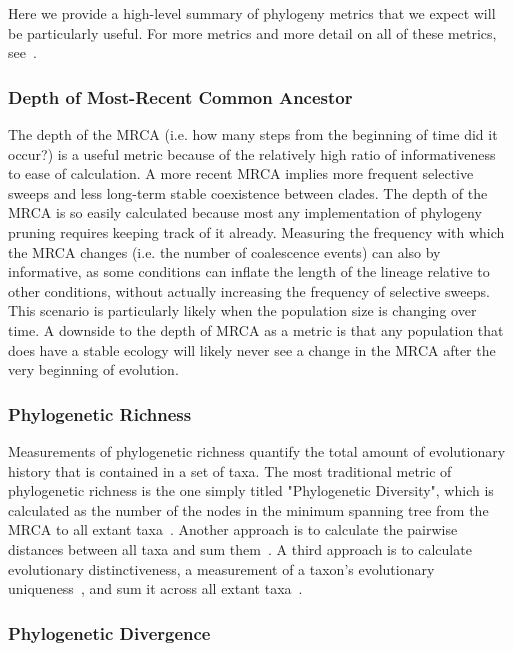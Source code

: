 \documentclass[letterpaper]{article}
\begin{document}
Here we provide a high-level summary of phylogeny metrics that we expect will be particularly useful. For more metrics and more detail on all of these metrics, see~\citep{winter_phylogenetic_2013, tucker_guide_2017}. 

\subsubsection{Depth of Most-Recent Common Ancestor}

The depth of the MRCA (i.e. how many steps from the beginning of time did it occur?) is a useful metric because of the relatively high ratio of informativeness to ease of calculation. A more recent MRCA implies more frequent selective sweeps and less long-term stable coexistence between clades. The depth of the MRCA is so easily calculated because most any implementation of phylogeny pruning requires keeping track of it already. Measuring the frequency with which the MRCA changes (i.e. the number of coalescence events) can also by informative, as some conditions can inflate the length of the lineage relative to other conditions, without actually increasing the frequency of selective sweeps. This scenario is particularly likely when the population size is changing over time. A downside to the depth of MRCA as a metric is that any population that does have a stable ecology will likely never see a change in the MRCA after the very beginning of evolution.

\subsubsection{Phylogenetic Richness}

Measurements of phylogenetic richness quantify the total amount of evolutionary history that is contained in a set of taxa. The most traditional metric of phylogenetic richness is the one simply titled "Phylogenetic Diversity", which is calculated as the number of the nodes in the minimum spanning tree from the MRCA to all extant taxa~\citep{faith_conservation_1992}. Another approach is to calculate the pairwise distances between all taxa and sum them~\citep{tucker_guide_2017}. A third approach is to calculate evolutionary distinctiveness, a measurement of a taxon's evolutionary uniqueness~\citep{isaac_mammals_2007}, and sum it across all extant taxa~\citep{tucker_guide_2017}.

\subsubsection{Phylogenetic Divergence}
\end{document}
